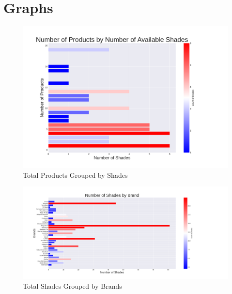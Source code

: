 \documentclass{article}
\begin{document}
\section{Graphs}
\begin{center}
    
    \begin{figure}[htbp]
        \centering
        \includegraphics[scale=0.5]{../images/TotalProductsByShades.pdf}
        \caption{Total Products Grouped by Shades}
        \label{Products_by_Shades}
    \end{figure}
    
    
    \begin{landscape}
    \begin{figure}[htbp]
        \centering
        \includegraphics[scale=0.55]{../images/TotalShadesByBrand.pdf}
        \caption{Total Shades Grouped by Brands}
        \label{Shades_by_Brands}
    \end{figure}
    \end{landscape}


\end{center}
\end{document}
